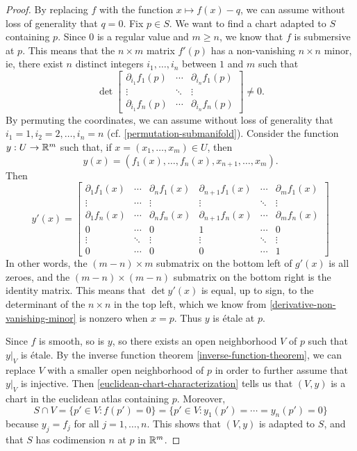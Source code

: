 \begin{proof}
	By replacing $f$ with the function $x \mapsto f(x)-q$, we can assume without loss of generality that $q = 0$. Fix $p \in S$. We want to find a chart adapted to $S$ containing $p$. Since $0$ is a regular value and $m \geq n$, we know that $f$ is submersive at $p$. This means that the $n \times m$ matrix $f'(p)$ has a non-vanishing $n \times n$ minor, ie, there exist $n$ distinct integers $i_1, \dotsc, i_n$ between $1$ and $m$ such that 
	\begin{equation} \label{derivative-non-vanishing-minor} 
	\det \begin{bmatrix} \partial_{i_1} f_1(p) & \dotsb & \partial_{i_n} f_1(p) \\ \vdots & \ddots & \vdots \\ \partial_{i_1} f_n(p) & \dotsb & \partial_{i_n} f_n(p) \end{bmatrix} \neq 0. 
	\end{equation}
	By permuting the coordinates, we can assume without loss of generality that $i_1 = 1, i_2 = 2, \dotsc, i_n = n$ (cf. \cref{permutation-submanifold}). Consider the function $y : U \to \mathbb{R}^m$ such that, if $x = (x_1, \dotsc, x_m) \in U$, then
	\[ y(x) = (f_1(x), \dotsc, f_n(x), x_{n+1}, \dotsc, x_m). \]
	Then
	\[ y'(x) = 
	\begin{bmatrix} 
	\partial_1 f_1(x) & \dotsb & \partial_n f_1(x) & \partial_{n+1} f_1(x) & \dotsb & \partial_m f_1(x) \\ 
	\vdots & \dotsb & \vdots & \vdots & \ddots & \vdots \\ 
	\partial_1 f_n(x) & \dotsb & \partial_n f_n(x) & \partial_{n+1} f_n(x) & \dotsb & \partial_m f_n(x) \\
	0 & \dotsb & 0 & 1 & \dotsb & 0 \\ 
	\vdots & \ddots & \vdots & \vdots & \ddots & \vdots \\ 
	0 & \dotsb & 0 & 0 & \dotsb & 1
	\end{bmatrix} \]
	In other words, the $(m-n) \times m$ submatrix on the bottom left of $g'(x)$ is all zeroes, and the $(m-n) \times (m-n)$ submatrix on the bottom right is the identity matrix. This means that $\det y'(x)$ is equal, up to sign, to the determinant of the $n \times n$ in the top left, which we know from \cref{derivative-non-vanishing-minor} is nonzero when $x = p$. Thus $y$ is \'etale at $p$. 
	
	Since $f$ is smooth, so is $y$, so there exists an open neighborhood $V$ of $p$ such that $y|_V$ is \'etale. By the inverse function theorem \ref{inverse-function-theorem}, we can replace $V$ with a smaller open neighborhood of $p$ in order to further assume that $y|_V$ is injective. Then \cref{euclidean-chart-characterization} tells us that $(V, y)$ is a chart in the euclidean atlas containing $p$. Moreover, 
	\[ S \cap V = \{ p' \in V : f(p') = 0 \} = \{ p' \in V : y_1(p') = \dotsb = y_n(p') = 0 \} \]
	because $y_j = f_j$ for all $j = 1, \dotsc, n$. This shows that $(V,y)$ is adapted to $S$, and that $S$ has codimension $n$ at $p$ in $\mathbb{R}^m$. 
\end{proof}

